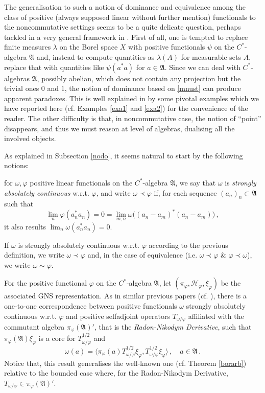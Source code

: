 \documentclass[12pt]{amsart}
\numberwithin{equation}{section}
\def\ch{{\mathcal H}}
\def\ga{{\mathfrak A}} \def\gpa{{\mathfrak a}}
\def\l{\lambda} \def\L{\Lambda}
\def\f{\varphi}\def\ff{\phi} \def\F{\Phi}
\def\om{\omega} \def\Om{\Omega}
\begin{document}
The generalisation to such a notion of dominance and equivalence among the class of positive (always supposed linear without further mention) functionals to the noncommutative settings seems to be a quite delicate question, perhaps tackled in a very general framework in \cite{G}.  First of all, one is tempted to replace finite measures $\l$ on the Borel space $X$ with positive functionals $\psi$ on the $C^*$-algebra $\ga$ and, instead to compute quantities as $\l(A)$ for measurable sets $A$, replace that with quantities like $\psi(a^*a)$ for $a\in\ga$. Since we can deal with $C^*$-algebras $\ga$, possibly abelian, which does not contain any projection but the trivial ones $0$ and $1$, the notion of dominance based on \eqref{mnust} can produce apparent paradoxes.
This is well explained in \cite{G} by some pivotal examples which we have reported here (cf. Examples \ref{exa1} and \ref{exa2}) for the convenience of the reader. The other difficulty is that, in noncommutative case, the notion of ``point'' disappears, and thus we must reason at level of algebras, dualising all the involved objects.

As explained in Subsection \ref{nodo}, it seems natural to start by the following notions:\\

\smallskip

\noindent
for $\om,\f$ positive linear functionals on the $C^*$-algebra $\ga$, we say that $\om$ is {\it strongly absolutely continuous} w.r.t. $\f$, and write $\om\prec\f$ if, for each sequence $(a_n)_n\subset\ga$ such that
$$
\lim_n\f(a_n^*a_n)=0=\lim_{m,n}\om\big((a_n-a_m)^*(a_n-a_m)\big)\,,
$$
it also results $\lim_n\om(a_n^*a_n)=0$.

\bigskip

\noindent
If $\om$ is strongly absolutely continuous w.r.t. $\f$ according to the previous definition, we write $\om\prec\f$ and, in the case of equivalence (i.e. 
$\om\prec\f\,\,\&\,\,\f\prec\om$), we write $\om\sim\f$.

\medskip

For the positive functional $\f$ on the $C^*$-algebra $\ga$, let $(\pi_\f,\ch_\f,\xi_\f)$ be the associated GNS representation.
As in similar previous papers (cf. \cite{N, G, Hi}), there is a one-to-one correspondence between 
positive functionals $\om$ strongly absolutely continuous w.r.t. $\f$ and positive selfadjoint operators $T_{\om/\f}$ affiliated with the commutant algebra
$\pi_\f(\ga)'$, that is the {\it Radon-Nikodym Derivative}, such that $\pi_\f(\ga)\xi_\f$ is a core for $T_{\om/\f}^{1/2}$ and
$$
\om(a)=\big\langle\pi_\f(a)T_{\om/\f}^{1/2}\xi_\f,T_{\om/\f}^{1/2}\xi_\f\big\rangle\,,\quad a\in\ga\,.
$$
Notice that, this result generalises the well-known one (cf. Theorem \ref{borarb})
relative to the bounded case where, for the Radon-Nikodym Derivative, $T_{\om/\f}\in\pi_\f(\ga)'$.
\end{document}
